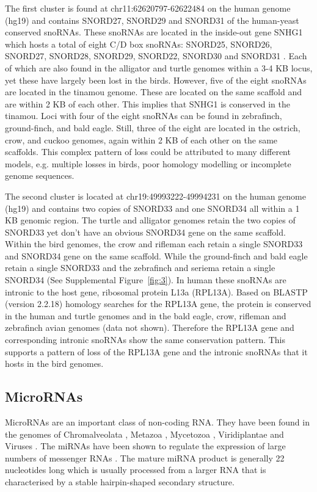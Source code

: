\documentclass[10pt]{bmc_article}
\newenvironment{bmcformat}{\begin{raggedright}\baselineskip20pt\sloppy\setboolean{publ}{false}}{\end{raggedright}\baselineskip20pt\sloppy}
\begin{document}
\begin{bmcformat}
The first cluster is found at chr11:62620797-62622484 on the human
genome (hg19) and contains SNORD27, SNORD29 and SNORD31 of the
human-yeast conserved snoRNAs. These snoRNAs are located in the
inside-out gene SNHG1 which hosts a total of eight C/D box snoRNAs:
SNORD25, SNORD26, SNORD27, SNORD28, SNORD29, SNORD22, SNORD30 and
SNORD31 \cite{Tycowski:1996}. Each of which are also found in the
alligator and turtle genomes within a 3-4 KB locus, yet these have
largely been lost in the birds. However, five of the eight snoRNAs are
located in the tinamou genome. These are located on the same scaffold
and are within 2 KB of each other. This implies that SNHG1 is
conserved in the tinamou. Loci with four of the eight snoRNAs can be
found in zebrafinch, ground-finch, and bald eagle. Still, three of the
eight are located in the ostrich, crow, and cuckoo genomes, again
within 2 KB of each other on the same scaffolds. This complex pattern
of loss could be attributed to many different models, e.g. multiple
losses in birds, poor homology modelling or incomplete genome
sequences.


The second cluster is located at chr19:49993222-49994231 on the human
genome (hg19) and contains two copies of SNORD33 and one SNORD34 all
within a 1 KB genomic region. The turtle and alligator genomes retain
the two copies of SNORD33 yet don't have an obvious SNORD34 gene on
the same scaffold. Within the bird genomes, the crow and rifleman each
retain a single SNORD33 and SNORD34 gene on the same scaffold. While
the ground-finch and bald eagle retain a single SNORD33 and the
zebrafinch and seriema retain a single SNORD34 (See Supplemental
Figure~\ref{fig:3}).  In human these snoRNAs are intronic to the host
gene, ribosomal protein L13a (RPL13A). Based on BLASTP (version
2.2.18) homology searches for the RPL13A gene, the protein is
conserved in the human and turtle genomes and in the bald eagle, crow,
rifleman and zebrafinch avian genomes (data not shown). Therefore the
RPL13A gene and corresponding intronic snoRNAs show the same
conservation pattern. This supports a pattern of loss of the RPL13A
gene and the intronic snoRNAs that it hosts in the bird genomes.


\subsection*{MicroRNAs}
MicroRNAs are an important class of non-coding RNA. They have been
found in the genomes of Chromalveolata \cite{Cock:2010,Huang:2011},
Metazoa \cite{Lee:1993,Lau:2001,Hertel:2006}, Mycetozoa
\cite{Hinas:2007,Avesson:2012}, Viridiplantae
\cite{Reinhart:2002,Fattash:2007,Axtell:2007,Molnar:2007} and Viruses
\cite{Pfeffer:2004,Ouellet:2008,Pfeffer:2005,Landgraf:2007}. The
miRNAs have been shown to regulate the expression of large numbers of
messenger RNAs \cite{Lim:2005}. The mature miRNA product is generally
22 nucleotides long which is usually processed from a larger RNA that
is characterised by a stable hairpin-shaped secondary structure.


\end{bmcformat}
\end{document}
